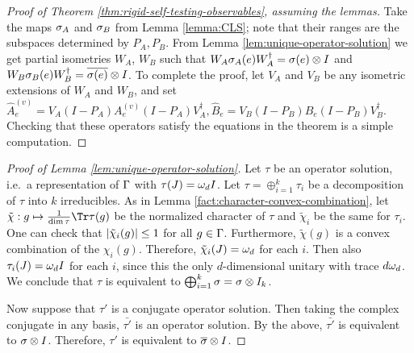 \begin{proof}[Proof of Theorem \ref{thm:rigid-self-testing-observables}, assuming the lemmas]

	Take the maps $\sigma_A$ and $\sigma_B$ from Lemma \ref{lemma:CLS}; note that their ranges are the subspaces determined by $P_A, P_B$. From Lemma \ref{lem:unique-operator-solution} we get partial isometries $W_A$, $W_B$ such that $W_A\sigma_A(e)W_A^\dagger = \sigma(e)\otimes I$ and $W_B\sigma_B(e)W_B^\dagger = \overline{\sigma(e)}\otimes I$. To complete the proof, let $V_A$ and $V_B$ be any isometric extensions of $W_A$ and $W_B$, and set 
	$\hat A_e^{(v)} = V_A(I-P_A)A_e^{(v)}(I-P_A)V_A^\dagger, \hat B_e = V_B(I-P_B)B_e(I-P_B)V_B^\dagger$. Checking that these operators satisfy the equations in the theorem is a simple computation. 
\end{proof}


\begin{proof}[Proof of Lemma \ref{lem:unique-operator-solution}]
	Let $\tau$ be an operator solution, i.e.\ a representation of $\Gamma$ with $\tau(J) = \omega_d I$. Let $\tau = \oplus_{i=1}^k\tau_i$ be a decomposition of $\tau$ into $k$ irreducibles. 
	As in Lemma \ref{fact:character-convex-combination}, let $\tilde \chi: g\mapsto \frac1{\dim \tau}\Tr\tau(g)$ be the normalized character of $\tau$ and $\tilde \chi_i$ be the same for $\tau_i$. One can check that $\left\vert\tilde\chi_i(g)\right\vert \leq 1$ for all $g\in \Gamma$. Furthermore, $\tilde\chi(g)$ is a convex combination of the $\chi_i(g)$. Therefore, $\tilde\chi_i(J) = \omega_d$ for each $i$. Then also $\tau_i(J) = \omega_dI$ for each $i$, since this the only $d$-dimensional unitary with trace $d\omega_d$. We conclude that  $\tau$ is equivalent to $\bigoplus_{i=1}^k\sigma = \sigma\otimes I_k$. 

	Now suppose that $\tau'$ is a conjugate operator solution. Then taking the complex conjugate in any basis, $\bar{\tau'}$ is an operator solution. By the above, $\bar{\tau'}$ is equivalent to $\sigma\otimes I$. Therefore, $\tau'$ is equivalent to $\overline{\sigma}\otimes I$.
\end{proof}

